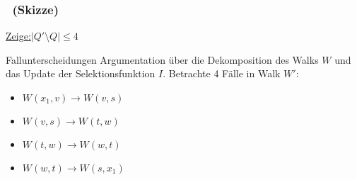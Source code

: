\begin{frame}
    \frametitle{\insertsubsection~(Skizze)}
    \underline{Zeige:}\qquad $|Q' \setminus Q| \leq 4$\\
    \vspace{1em}
    \begin{block}{Fallunterscheidungen}
        \vspace{.7em}
        Argumentation über die Dekomposition des Walks $W$ und das Update der Selektionsfunktion $I$.
        Betrachte 4 Fälle in Walk $W'$:
        \begin{itemize}
            \itemsep\setlength{.5em}
            \item $W(x_1, v) \rightarrow W(v, s)$
            \item $W(v, s) \rightarrow W(t, w)$
            \item $W(t, w) \rightarrow W(w, t)$
            \item $W(w, t) \rightarrow W(s, x_1)$
        \end{itemize}
        \vspace{.1em}
    \end{block}
\end{frame}
